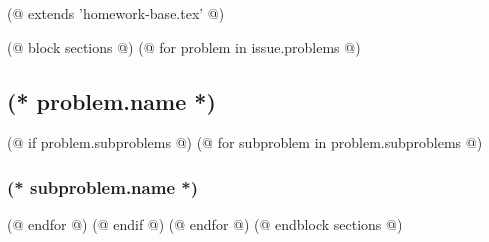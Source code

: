 (@ extends 'homework-base.tex' @)

(@ block sections @)
    (@ for problem in issue.problems @)
        \subsection{(* problem.name *)}
        (@ if problem.subproblems @)
            (@ for subproblem in problem.subproblems @)
                \subsubsection{(* subproblem.name *)}
            (@ endfor @)
        (@ endif @)
    (@ endfor @)
(@ endblock sections @)
